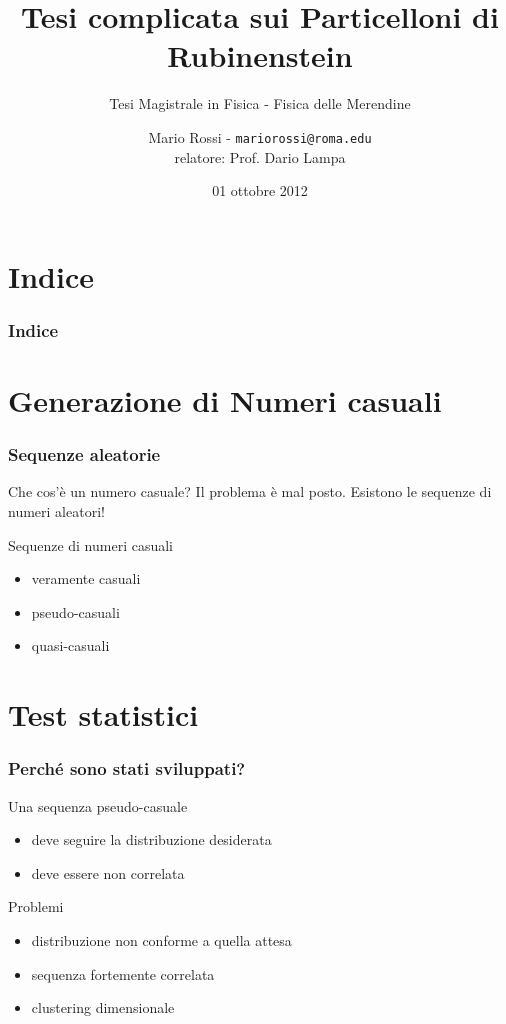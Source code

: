 \documentclass{beamer}
\title[Tesi complicata]{Tesi complicata sui Particelloni di Rubinenstein}
\subtitle[Tesi Magistrale]{Tesi Magistrale in Fisica - Fisica delle Merendine}
\author[Mario]{Mario Rossi - \texttt{mariorossi@roma.edu} \\
relatore: Prof. Dario Lampa}
\date{01 ottobre 2012}
\institute[Sapienza Università di Roma]{
  Dipartimento di Fisica\\
  Sapienza Università di Roma}
\theoremstyle{definition}
\theoremstyle{plain}
\begin{document}
\titlepageframe %

\section*{Indice}
\begin{frame}
  \frametitle{Indice}
  \tableofcontents
\end{frame}

\section[Numeri casuali]{Generazione di Numeri casuali}
\begin{frame}
  \frametitle{Sequenze aleatorie}
  \begin{block}{Che cos’è un numero casuale?}
    Il problema è mal posto. Esistono le \alert{sequenze} di numeri aleatori!
  \end{block}
  \begin{block}{Sequenze di numeri casuali}
    \begin{itemize}
	  \item veramente casuali
      \item pseudo-casuali
      \item quasi-casuali
    \end{itemize}
  \end{block}
\end{frame}

\section[Test]{Test statistici}
\begin{frame}
  \frametitle{Perché sono stati sviluppati?}
  \begin{block}{Una sequenza pseudo-casuale}
    \begin{itemize}
      \item deve seguire la distribuzione desiderata
      \item deve essere non correlata
    \end{itemize}
  \end{block}
  \begin{block}{Problemi}
    \begin{itemize}
      \item distribuzione non conforme a quella attesa
      \item sequenza fortemente correlata
      \item clustering dimensionale
    \end{itemize}  
  \end{block}
\end{frame}
\end{document}
